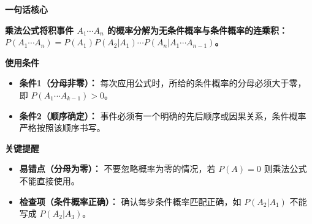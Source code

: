 \begin{summarybox}
	\textbf{\textcolor{CSummary}{一句话核心}}

	\textbf{乘法公式将积事件 $A_1\cdots A_n$ 的概率分解为无条件概率与条件概率的连乘积：$P(A_1\cdots A_n)=P(A_1)P(A_2|A_1)\cdots P(A_n|A_1\cdots A_{n-1})$。}

	\medskip
	\textbf{\textcolor{CSummary}{使用条件}}
	\begin{itemize}[leftmargin=*, itemsep=0.5em, topsep=0.4em]
		\item \textbf{条件1（分母非零）：} 每次应用公式时，所给的条件概率的分母必须大于零，即 $P(A_1\cdots A_{k-1})>0$。
		\item \textbf{条件2（顺序确定）：} 事件必须有一个明确的先后顺序或因果关系，条件概率严格按照该顺序书写。
	\end{itemize}

	\medskip
	\textbf{\textcolor{CSummary}{关键提醒}}
	\begin{itemize}[leftmargin=*, itemsep=0.5em, topsep=0.4em]
		\item \textbf{易错点（分母为零）：} 不要忽略概率为零的情况，若 $P(A)=0$ 则乘法公式不能直接使用。
		\item \textbf{检查项（条件概率正确）：} 确认每步条件概率匹配正确，如 $P(A_2|A_1)$ 不能写成 $P(A_2|A_3)$。
	\end{itemize}
\end{summarybox}
